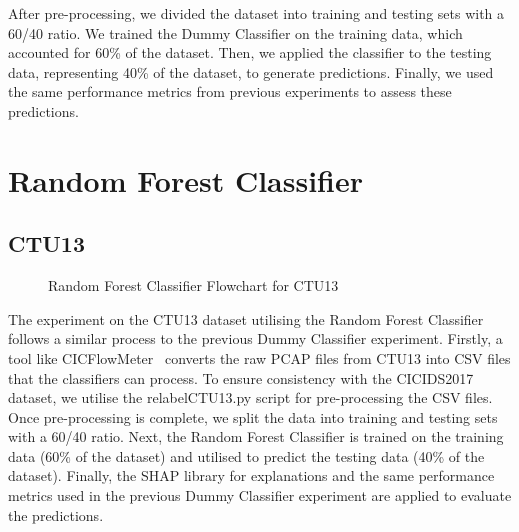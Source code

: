 After pre-processing, we divided the dataset into training and testing sets with a 60/40 ratio. We trained the Dummy Classifier on the training data, which accounted for 60\% of the dataset. Then, we applied the classifier to the testing data, representing 40\% of the dataset, to generate predictions. Finally, we used the same performance metrics from previous experiments to assess these predictions.

\section{Random Forest Classifier}\label{sec:RandomForestClassifier}

\subsection{CTU13}\label{subsec:RandomForestClassifierCTU13}
\begin{figure}[H]
\centering
{}
\caption{Random Forest Classifier Flowchart for CTU13}\label{fig:RandomForestFlowCTU13}
\end{figure}

The experiment on the CTU13 dataset utilising the Random Forest Classifier follows a similar process to the previous Dummy Classifier experiment. Firstly, a tool like CICFlowMeter~\cite{lashkari2017characterization} converts the raw PCAP files from CTU13 into CSV files that the classifiers can process. To ensure consistency with the CICIDS2017 dataset, we utilise the relabelCTU13.py script for pre-processing the CSV files. Once pre-processing is complete, we split the data into training and testing sets with a 60/40 ratio. Next, the Random Forest Classifier is trained on the training data (60\% of the dataset) and utilised to predict the testing data (40\% of the dataset). Finally, the SHAP library for explanations and the same performance metrics used in the previous Dummy Classifier experiment are applied to evaluate the predictions.

